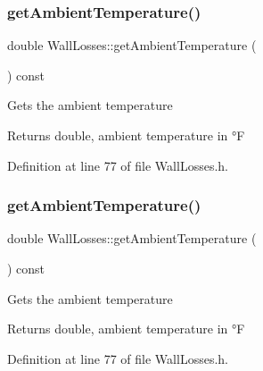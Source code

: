 \mbox{\label{class_wall_losses_a806cb5860fe78d0379e3877f043655ad}} 
\subsubsection{\texorpdfstring{get\+Ambient\+Temperature()}{getAmbientTemperature()}\hspace{0.1cm}{\footnotesize\ttfamily [2/3]}}
{\footnotesize\ttfamily double Wall\+Losses\+::get\+Ambient\+Temperature (\begin{DoxyParamCaption}{ }\end{DoxyParamCaption}) const\hspace{0.3cm}{\ttfamily [inline]}}

Gets the ambient temperature \begin{DoxyReturn}{Returns}
double, ambient temperature in °F 
\end{DoxyReturn}


Definition at line 77 of file Wall\+Losses.\+h.

\mbox{\label{class_wall_losses_a806cb5860fe78d0379e3877f043655ad}} 
\subsubsection{\texorpdfstring{get\+Ambient\+Temperature()}{getAmbientTemperature()}\hspace{0.1cm}{\footnotesize\ttfamily [3/3]}}
{\footnotesize\ttfamily double Wall\+Losses\+::get\+Ambient\+Temperature (\begin{DoxyParamCaption}{ }\end{DoxyParamCaption}) const\hspace{0.3cm}{\ttfamily [inline]}}

Gets the ambient temperature \begin{DoxyReturn}{Returns}
double, ambient temperature in °F 
\end{DoxyReturn}


Definition at line 77 of file Wall\+Losses.\+h.

\mbox{\label{class_wall_losses_a16ab4003a17f9e95f28b9390b92c2b27}} 
